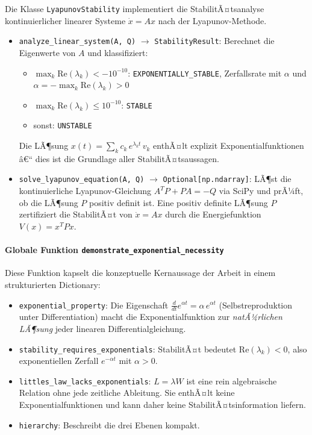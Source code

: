 ﻿\documentclass[a4paper,12pt]{report}
\theoremstyle{definition}
\begin{document}
Die Klasse \texttt{LyapunovStability} implementiert die
StabilitÃ¤tsanalyse kontinuierlicher linearer Systeme
$\dot{x} = Ax$ nach der Lyapunov-Methode.

\begin{itemize}
	\item \texttt{analyze\_linear\_system(A, Q)} $\to$
	\texttt{StabilityResult}:  Berechnet die Eigenwerte von $A$
	und klassifiziert:
	\begin{itemize}
		\item $\max_k \text{Re}(\lambda_k) < -10^{-10}$:
		\texttt{EXPONENTIALLY\_STABLE}, Zerfallsrate mit $\alpha$ und
		$\alpha = -\max_k \text{Re}(\lambda_k) > 0$
		\item $\max_k \text{Re}(\lambda_k) \leq 10^{-10}$:
		\texttt{STABLE}
		\item sonst: \texttt{UNSTABLE}
	\end{itemize}
	Die LÃ¶sung $x(t) = \sum_k c_k\, e^{\lambda_k t}\, v_k$
	enthÃ¤lt explizit Exponentialfunktionen â€“ dies ist die
	Grundlage aller StabilitÃ¤tsaussagen.
	
	\item \texttt{solve\_lyapunov\_equation(A, Q)} $\to$
	\texttt{Optional[np.ndarray]}:  LÃ¶st die kontinuierliche
	Lyapunov-Gleichung $A^T P + P A = -Q$ via SciPy und prÃ¼ft,
	ob die LÃ¶sung $P$ positiv definit ist.  Eine positiv definite
	LÃ¶sung $P$ zertifiziert die StabilitÃ¤t von $\dot{x} = Ax$
	durch die Energiefunktion $V(x) = x^T P x$.
\end{itemize}

\paragraph{Globale Funktion \texttt{demonstrate\_exponential\_necessity}}

Diese Funktion kapselt die konzeptuelle Kernaussage der Arbeit in
einem strukturierten Dictionary:

\begin{itemize}
	\item \texttt{exponential\_property}: Die Eigenschaft
	$\frac{d}{dt}e^{\alpha t} = \alpha\,e^{\alpha t}$
	(Selbstreproduktion unter Differentiation) macht die
	Exponentialfunktion zur \emph{natÃ¼rlichen LÃ¶sung} jeder
	linearen Differentialgleichung.
	\item \texttt{stability\_requires\_exponentials}: StabilitÃ¤t
	bedeutet $\text{Re}(\lambda_k) < 0$, also exponentiellen
	Zerfall $e^{-\alpha t}$ mit $\alpha > 0$.
	\item \texttt{littles\_law\_lacks\_exponentials}: $L = \lambda W$
	ist eine rein algebraische Relation ohne jede zeitliche
	Ableitung.  Sie enthÃ¤lt keine Exponentialfunktionen und
	kann daher keine StabilitÃ¤tsinformation liefern.
	\item \texttt{hierarchy}: Beschreibt die drei Ebenen kompakt.
\end{itemize}
\end{document}
